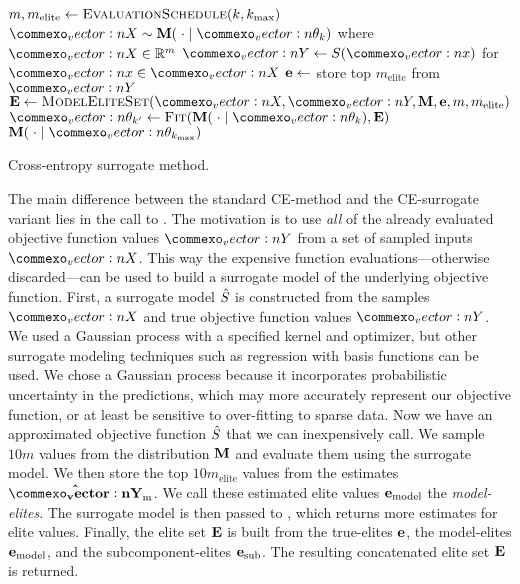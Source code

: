 \begin{algorithm}[ht]
  \begin{algorithmic}
        \State $m, m_\text{elite} \leftarrow \textproc{EvaluationSchedule}(k, k_\text{max})$
        \State $\mat{X} \sim \M(\;\cdot \mid \vec{\theta}_k)$ where $\mat{X} \in \R^m$
        \State $\mat{Y} \leftarrow S(\vec{x})$ for $\vec{x} \in \mat{X}$
        \State $\mathbf{e} \leftarrow$ store top $m_\text{elite}$ from $\mat{Y}$
        \State $\bfE \leftarrow \textproc{ModelEliteSet}(\mat{X}, \mat{Y}, \M, \e, m, m_\text{elite})$
        \State $\vec{\theta}_{k^\prime} \leftarrow \textproc{Fit}(\M(\;\cdot \mid \vec{\theta}_k), \bfE)$
    \EndFor
    \State \Return $\M(\;\cdot \mid \vec{\theta}_{k_\text{max}})$
  \EndFunction
  \end{algorithmic}
  \caption{\label{alg:ce_surrogate} Cross-entropy surrogate method.}
\end{algorithm}


The main difference between the standard CE-method and the CE-surrogate variant lies in the call to .
The motivation is to use \textit{all} of the already evaluated objective function values $\mat{Y}$ from a set of sampled inputs $\mat{X}$.
This way the expensive function evaluations---otherwise discarded---can be used to build a surrogate model of the underlying objective function.
First, a surrogate model $\hat{S}$ is constructed from the samples $\mat{X}$ and true objective function values $\mat{Y}$.
We used a Gaussian process with a specified kernel and optimizer, but other surrogate modeling techniques such as regression with basis functions can be used.
We chose a Gaussian process because it incorporates probabilistic uncertainty in the predictions, which may more accurately represent our objective function, or at least be sensitive to over-fitting to sparse data.
Now we have an approximated objective function $\hat{S}$ that we can inexpensively call. 
We sample $10m$ values from the distribution $\mathbf{M}$ and evaluate them using the surrogate model.
We then store the top $10m_\text{elite}$ values from the estimates $\mathbf{\hat{\mat{Y}}}_\text{m}$.
We call these estimated elite values $\mathbf{e}_\text{model}$ the \textit{model-elites}.
The surrogate model is then passed to , which returns more estimates for elite values.
Finally, the elite set $\mathbf{E}$ is built from the true-elites $\mathbf{e}$, the model-elites $\mathbf{e}_\text{model}$, and the subcomponent-elites $\mathbf{e}_\text{sub}$.
The resulting concatenated elite set $\mathbf{E}$ is returned.

